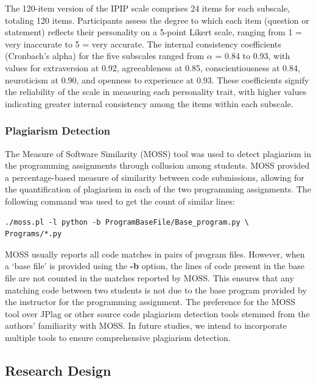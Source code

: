 The 120-item version of the IPIP scale comprises 24 items for each subscale, totaling 120 items. Participants assess the degree to which each item (question or statement) reflects their personality on a 5-point Likert scale, ranging from 1 = very inaccurate to 5 = very accurate. The internal consistency coefficients (Cronbach's alpha) for the five subscales ranged from \begin{math} \alpha \end{math} = 0.84 to 0.93, with values for extraversion at 0.92, agreeableness at 0.85, conscientiousness at 0.84, neuroticism at 0.90, and openness to experience at 0.93. These coefficients signify the reliability of the scale in measuring each personality trait, with higher values indicating greater internal consistency among the items within each subscale.

\subsubsection{Plagiarism Detection}

The Measure of Software Similarity (MOSS) tool \cite{MOSS} was used to detect plagiarism in the programming assignments through collusion among students. MOSS provided a percentage-based measure of similarity between code submissions, allowing for the quantification of plagiarism in each of the two programming assignments. The following command was used to get the count of similar lines: 
\begin{verbatim}
./moss.pl -l python -b ProgramBaseFile/Base_program.py \
Programs/*.py
\end{verbatim}

MOSS usually reports all code matches in pairs of program files. However, when a `base file' is provided using the \textbf{-b} option, the lines of code present in the base file are not counted in the matches reported by MOSS. This ensures that any matching code between two students is not due to the base program provided by the instructor for the programming assignment. The preference for the MOSS tool over JPlag or other source code plagiarism detection tools stemmed from the authors' familiarity with MOSS. In future studies, we intend to incorporate multiple tools to ensure comprehensive plagiarism detection.

\subsection{Research Design}

